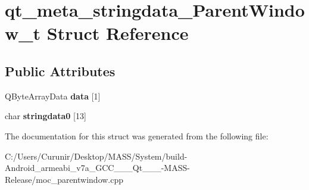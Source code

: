 \hypertarget{structqt__meta__stringdata___parent_window__t}{}\section{qt\+\_\+meta\+\_\+stringdata\+\_\+\+Parent\+Window\+\_\+t Struct Reference}
\label{structqt__meta__stringdata___parent_window__t}
\subsection*{Public Attributes}
\begin{DoxyCompactItemize}
\item 
\mbox{\label{structqt__meta__stringdata___parent_window__t_ac8323f8e16efb15d9e992723d79d4eb6}} 
Q\+Byte\+Array\+Data {\bfseries data} \mbox{[}1\mbox{]}
\item 
\mbox{\label{structqt__meta__stringdata___parent_window__t_a7a8ddf75c5026020d7983618531ece63}} 
char {\bfseries stringdata0} \mbox{[}13\mbox{]}
\end{DoxyCompactItemize}


The documentation for this struct was generated from the following file\+:\begin{DoxyCompactItemize}
\item 
C\+:/\+Users/\+Curunir/\+Desktop/\+M\+A\+S\+S/\+System/build-\/\+Android\+\_\+armeabi\+\_\+v7a\+\_\+\+G\+C\+C\+\_\+\_\+\_\+\+Qt\+\_\+\_\+\_-\/\+M\+A\+S\+S-\/\+Release/moc\+\_\+parentwindow.\+cpp\end{DoxyCompactItemize}
